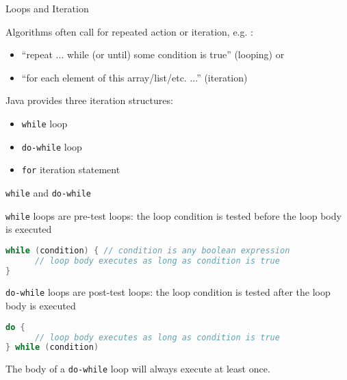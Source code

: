 \documentclass{beamer}
\begin{document}
\begin{frame}
  \titlepage
\end{frame}


\begin{frame}[fragile]{}

\begin{center}
\end{center}

\end{frame}


\begin{frame}[fragile]{Loops and Iteration}


Algorithms often call for repeated action or iteration, e.g. :
\begin{itemize}
\item ``repeat ... while (or until) some condition is true'' (looping) or
\item ``for each element of this array/list/etc. ...'' (iteration)
\end{itemize}

Java provides three iteration structures:
\begin{itemize}
\item {\tt while} loop
\item {\tt do-while} loop
\item {\tt for} iteration statement
\end{itemize}


\end{frame}

\begin{frame}[fragile]{{\tt while} and {\tt do-while}}

{\tt while} loops are pre-test loops: the loop condition is tested before the loop body is executed
\begin{lstlisting}[language=Java]
while (condition) { // condition is any boolean expression
      // loop body executes as long as condition is true
}
\end{lstlisting}

{\tt do-while} loops are post-test loops: the loop condition is tested after the loop body is executed
\begin{lstlisting}[language=Java]
do {
      // loop body executes as long as condition is true
} while (condition)
\end{lstlisting}
The body of a {\tt do-while} loop will always execute at least once.

\end{frame}
\end{document}
